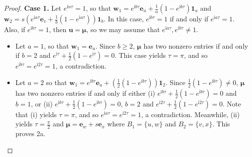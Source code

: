 \documentclass{article}
\numberwithin{equation}{section}
\newcommand{\uno}{\mathbf 1}
\newcommand{\be}{\mathbf e}
\newcommand{\bu}{\mathbf u}
\newcommand{\bw}{\mathbf w}
\newcommand{\bmu}{{\boldsymbol{\mu}}}
\def\ii{\mathrm{i}}
\begin{document}
{\begin{proof}
\noindent \textbf{Case 1.} Let $e^{\ii n \tau}=1$, so that $\bw_1=e^{\ii b \tau}\be_u+\frac{1}{a}\left(1-e^{\ii b \tau}\right)\uno_a$ and $\bw_2=s\left(e^{\ii a \tau}\be_v+\frac{1}{b}(1-e^{\ii a \tau})\right)\uno_b$. In this case, $e^{\ii b \tau}=1$ if and only if $e^{\ii a \tau}=1$. Also, if $e^{\ii b \tau}=1$, then $\bu=\bmu$, so we may assume that $e^{\ii a \tau},e^{\ii b \tau}\neq 1$.
\begin{itemize}
\item Let $a=1$, so that $\bw_1=\be_u$. Since $b\geq 2$, $\bmu$ has two nonzero entries if and only if $b=2$ and $e^{\ii \tau}+\frac{1}{2}(1-e^{\ii \tau })=0$. This case yields $\tau=\pi$, and so $e^{\ii b \tau}=e^{\ii2\tau}=1$, a contradiction.
\item Let $a=2$ so that $\bw_1=e^{\ii b \tau}\be_u+\left(\frac{1}{2}(1-e^{\ii b \tau})\right)\uno_2$. Since $\frac{1}{2}(1-e^{\ii b \tau})\neq 0$, $\bmu$ has two nonzero entries if and only if either (i) $e^{\ii b \tau}+\frac{1}{2}(1-e^{\ii b \tau})=0$ and $b=1$, or (ii) $e^{\ii b \tau}+\frac{1}{2}(1-e^{\ii b \tau})=0$, $b=2$ and $e^{\ii 2\tau}+\frac{1}{2}(1-e^{\ii 2\tau})=0$. Note that (i) yields $\tau=\pi$, and so $e^{\ii a \tau}=e^{\ii2\tau}=1$, a contradiction. Meanwhile, (ii) yields $\tau=\frac{\pi}{2}$ and $\bmu=\be_w+s\be_x$ where $B_1=\{u,w\}$ and $B_2=\{v,x\}$. This proves 2a.
\end{itemize}


\end{proof}}
\end{document}
